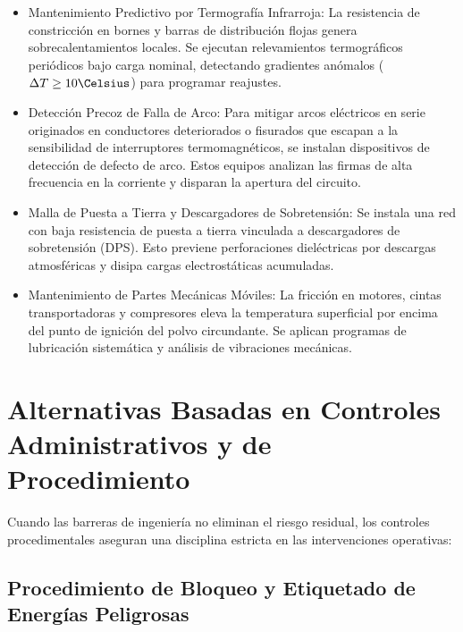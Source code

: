 \begin{itemize}
    \item Mantenimiento Predictivo por Termografía Infrarroja: La resistencia de constricción en bornes y barras de
          distribución flojas genera sobrecalentamientos locales. Se
          ejecutan relevamientos termográficos periódicos bajo carga nominal, detectando gradientes anómalos ($\Delta T \ge
          10\Celsius$) para programar reajustes.
    \item Detección Precoz de Falla de Arco: Para mitigar arcos eléctricos en serie originados
          en conductores deteriorados o fisurados que escapan a la sensibilidad de interruptores termomagnéticos, se
          instalan dispositivos de detección de defecto de arco. Estos equipos analizan las
          firmas de alta frecuencia en la corriente y disparan la apertura del circuito.
    \item Malla de Puesta a Tierra y Descargadores de Sobretensión: Se instala una red con baja resistencia de puesta a
          tierra vinculada a descargadores de sobretensión (DPS).  Esto previene perforaciones dieléctricas por
          descargas atmosféricas y disipa cargas electrostáticas acumuladas.
    \item Mantenimiento de Partes Mecánicas Móviles: La fricción en motores, cintas transportadoras y compresores eleva
          la temperatura superficial por encima del punto de ignición del polvo circundante. Se aplican programas de
          lubricación sistemática y análisis de vibraciones mecánicas.
\end{itemize}

\section{Alternativas Basadas en Controles Administrativos y de Procedimiento}
\label{sec.cap7:administrativos}

Cuando las barreras de ingeniería no eliminan el riesgo residual, los controles procedimentales aseguran una disciplina
estricta en las intervenciones operativas:

\subsection{Procedimiento de Bloqueo y Etiquetado de Energías Peligrosas}


